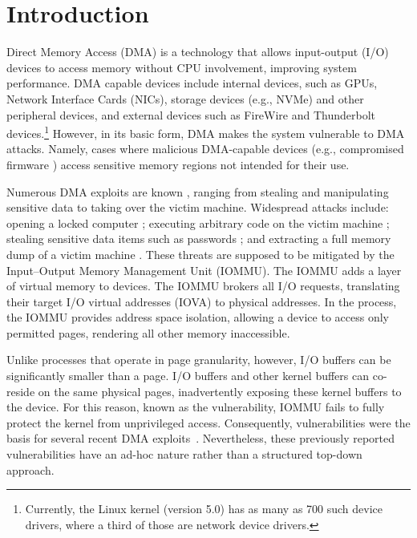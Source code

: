 \section{Introduction}

Direct Memory Access (DMA) is a technology that allows input-output (I/O) devices to access memory without CPU involvement, improving system performance.
DMA capable devices include internal devices, such as GPUs, Network Interface Cards (NICs), storage devices (e.g., NVMe) and other peripheral devices, and external devices such as FireWire and Thunderbolt devices.\footnote{Currently, the Linux kernel (version 5.0) has as many as 700 such device drivers, where a third of those are network device drivers.} However, in its basic form, DMA makes the system vulnerable to DMA attacks. Namely, cases where malicious DMA-capable devices (e.g., compromised firmware \cite{Gal14,Ben17a}) access sensitive memory regions not intended for their use. 


Numerous DMA exploits are known \cite{Dor04,BDK10,thunder}, ranging from stealing and manipulating sensitive data to taking over the victim machine. Widespread attacks include: opening a locked computer \cite{MM, Fin14}; executing arbitrary code on the victim machine \cite{Fri16, Woj08, AD10,thunder}; stealing sensitive data items such as passwords \cite{SB12, LKV13, Cim16, BR12}; and extracting a full memory dump of a victim machine \cite{MM, Vol, Fin14, GA10}. These threats are supposed to be mitigated by the Input–Output Memory Management Unit (IOMMU). The IOMMU adds a layer of virtual memory to devices. The IOMMU brokers all I/O requests, translating their target I/O virtual addresses (IOVA) to physical addresses. In the process, the IOMMU provides address space isolation, allowing a device to access only permitted pages, rendering all other memory inaccessible.

Unlike processes that operate in page granularity, however, I/O buffers can be significantly smaller than a page. I/O buffers and other kernel buffers can co-reside on the same physical pages, inadvertently exposing these kernel buffers to the device. For this reason, known as the \subpage{} vulnerability\cite{MMT16,thunder}, IOMMU fails to fully protect the kernel from unprivileged access. Consequently, \subpage{} vulnerabilities were the basis for several recent DMA exploits~\cite{thunder,Ben17a,Ben17b}.
Nevertheless, these previously reported vulnerabilities have an ad-hoc nature rather than a structured top-down approach. 

